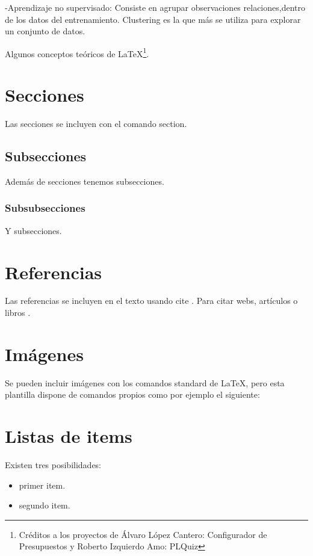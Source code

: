 -Aprendizaje no supervisado: Consiste en agrupar observaciones relaciones,dentro de los datos del entrenamiento. Clustering es la que más se utiliza para explorar un conjunto de datos.

Algunos conceptos teóricos de \LaTeX \footnote{Créditos a los proyectos de Álvaro López Cantero: Configurador de Presupuestos y Roberto Izquierdo Amo: PLQuiz}.

\section{Secciones}

Las secciones se incluyen con el comando section.

\subsection{Subsecciones}

Además de secciones tenemos subsecciones.

\subsubsection{Subsubsecciones}

Y subsecciones. 


\section{Referencias}

Las referencias se incluyen en el texto usando cite \cite{wiki:latex}. Para citar webs, artículos o libros \cite{koza92}.


\section{Imágenes}

Se pueden incluir imágenes con los comandos standard de \LaTeX, pero esta plantilla dispone de comandos propios como por ejemplo el siguiente:




\section{Listas de items}

Existen tres posibilidades:

\begin{itemize}
	\item primer item.
	\item segundo item.
\end{itemize}

